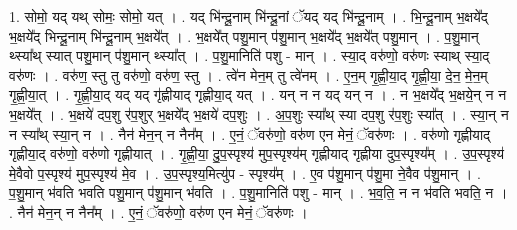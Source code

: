 \documentclass[17pt]{extarticle}
\begin{document}
1. सोमो॒ यद् यथ् सोमः॒ सोमो॒ यत् । . यद् भि॑न्दू॒नाम् भि॑न्दू॒नां ॅयद् यद् भि॑न्दू॒नाम् । . भि॒न्दू॒नाम् भ॒क्षये᳚द् भ॒क्षये᳚द् भिन्दू॒नाम् भि॑न्दू॒नाम् भ॒क्षये᳚त् । . भ॒क्षये᳚त् पशु॒मान् प॑शु॒मान् भ॒क्षये᳚द् भ॒क्षये᳚त् पशु॒मान् । . प॒शु॒मान् थ्स्या᳚थ् स्यात् पशु॒मान् प॑शु॒मान् थ्स्या᳚त् । . प॒शु॒मानिति॑ पशु - मान् । . स्या॒द् वरु॑णो॒ वरु॑णः स्याथ् स्या॒द् वरु॑णः । . वरु॑ण॒ स्तु तु वरु॑णो॒ वरु॑ण॒ स्तु । . त्वे॑न मेन॒म् तु त्वे॑नम् । . ए॒न॒म् गृ॒ह्णी॒या॒द् गृ॒ह्णी॒या॒ दे॒न॒ मे॒न॒म् गृ॒ह्णी॒या॒त् । . गृ॒ह्णी॒या॒द् यद् यद् गृ॑ह्णीयाद् गृह्णीया॒द् यत् । . यन् न न यद् यन् न । . न भ॒क्षये᳚द् भ॒क्षये॒न् न न भ॒क्षये᳚त् । . भ॒क्षये॑ दप॒शु र॑प॒शुर् भ॒क्षये᳚द् भ॒क्षये॑ दप॒शुः । . अ॒प॒शुः स्या᳚थ् स्या दप॒शु र॑प॒शुः स्या᳚त् । . स्या॒न् न न स्या᳚थ् स्या॒न् न । . नैन॑ मेन॒न् न नैन᳚म् । . ए॒नं॒ ॅवरु॑णो॒ वरु॑ण एन मेनं॒ ॅवरु॑णः । . वरु॑णो गृह्णीयाद् गृह्णीया॒द् वरु॑णो॒ वरु॑णो गृह्णीयात् । . गृ॒ह्णी॒या॒ दु॒प॒स्पृश्य॑ मुप॒स्पृश्य॑म् गृह्णीयाद् गृह्णीया दुप॒स्पृश्य᳚म् । . उ॒प॒स्पृश्य॑ मे॒वैवो प॒स्पृश्य॑ मुप॒स्पृश्य॑ मे॒व । . उ॒प॒स्पृश्य॒मित्यु॑प - स्पृश्य᳚म् । . ए॒व प॑शु॒मान् प॑शु॒मा ने॒वैव प॑शु॒मान् । . प॒शु॒मान् भ॑वति भवति पशु॒मान् प॑शु॒मान् भ॑वति । . प॒शु॒मानिति॑ पशु - मान् । . भ॒व॒ति॒ न न भ॑वति भवति॒ न । . नैन॑ मेन॒न् न नैन᳚म् । . ए॒नं॒ ॅवरु॑णो॒ वरु॑ण एन मेनं॒ ॅवरु॑णः । \newline
\end{document}
